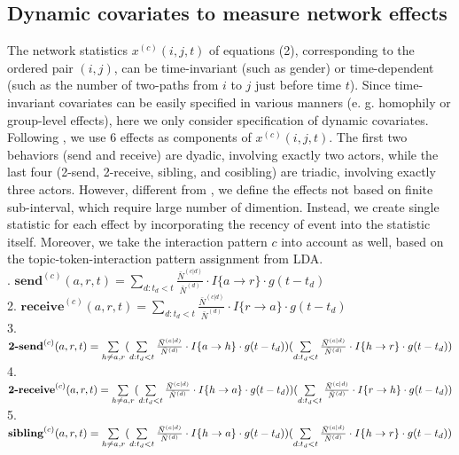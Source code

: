 \documentclass[a4paper]{article}
\begin{document}
\subsection{Dynamic covariates to measure network effects}
The network statistics $x^{(c)}(i, j, t)$ of equations (2), corresponding to the ordered pair $(i, j)$, can be time-invariant (such as gender) or time-dependent (such as the number of two-paths from $i$ to $j$ just before time $t$). Since time-invariant covariates can be easily specified in various manners (e. g. homophily or group-level effects), here we only consider specification of dynamic covariates.\\ \newline
Following \cite{PerryWolfe2012}, we use 6 effects as components of $x^{(c)}(i, j, t)$. The first two behaviors (send and receive) are dyadic, involving exactly two actors,
while the last four (2-send, 2-receive, sibling, and cosibling) are triadic, involving exactly three actors. However, different from \cite{PerryWolfe2012}, we define the effects not based on finite sub-interval, which require large number of dimention. Instead, we create single statistic for each effect by incorporating the recency of event into the statistic itself. Moreover, we take the interaction pattern $c$ into account as well, based on the topic-token-interaction pattern assignment from LDA. \\ . $\textbf{send}^{(c)}(a, r, t)=\sum\limits_{d: t_d<t} \frac{\bar N^{(c|d)}}{\bar N^{(d)}}\cdot I\{a\rightarrow r\}\cdot g(t-t_d)$\\
2. $\textbf{receive}^{(c)}(a, r, t)=\sum\limits_{d: t_d<t} \frac{\bar N^{(c|d)}}{\bar N^{(d)}}\cdot I\{r\rightarrow a\}\cdot g(t-t_d)$\\
3. $\textbf{2-send}^{(c)}(a, r, t)=\sum\limits_{h \neq a, r}\Large(\sum\limits_{d: t_d<t} \frac{\bar N^{(c|d)}}{\bar N^{(d)}}\cdot I\{a\rightarrow h\}\cdot g(t-t_d)\Large)\Large(\sum\limits_{d: t_d<t} \frac{\bar N^{(c|d)}}{\bar N^{(d)}}\cdot I\{h\rightarrow r\}\cdot g(t-t_d)\Large)$\\
4. $\textbf{2-receive}^{(c)}(a, r, t)=\sum\limits_{h \neq a, r}\Large(\sum\limits_{d: t_d<t} \frac{\bar N^{(c|d)}}{\bar N^{(d)}}\cdot I\{h\rightarrow a\}\cdot g(t-t_d)\Large)\Large(\sum\limits_{d: t_d<t} \frac{\bar N^{(c|d)}}{\bar N^{(d)}}\cdot I\{r\rightarrow h\}\cdot g(t-t_d)\Large)$\\
5. $\textbf{sibling}^{(c)}(a, r, t)=\sum\limits_{h \neq a, r}\Large(\sum\limits_{d: t_d<t} \frac{\bar N^{(c|d)}}{\bar N^{(d)}}\cdot I\{h\rightarrow a\}\cdot g(t-t_d)\Large)\Large(\sum\limits_{d: t_d<t} \frac{\bar N^{(c|d)}}{\bar N^{(d)}}\cdot I\{h\rightarrow r\}\cdot g(t-t_d)\Large)$\\
\end{document}
